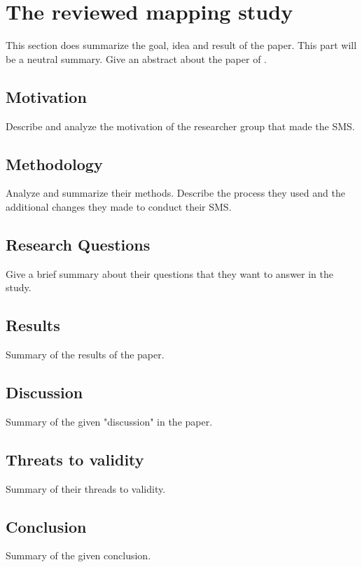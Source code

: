 \section{The reviewed mapping study}

This section does summarize the goal, idea and result of the paper.
This part will be a neutral summary.
Give an abstract about the paper of \cite{waseem:SMSMSADevOps}.

\subsection{Motivation}

Describe and analyze the motivation of the researcher group that made the SMS.

\subsection{Methodology}

Analyze and summarize their methods. Describe the process they used and the
additional changes they made to conduct their SMS.

\subsection{Research Questions}

Give a brief summary about their questions that they want to answer in the study.

\subsection{Results}

Summary of the results of the paper.

\subsection{Discussion}

Summary of the given "discussion" in the paper.

\subsection{Threats to validity}

Summary of their threads to validity.

\subsection{Conclusion}

Summary of the given conclusion.